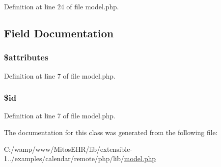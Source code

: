 \-Definition at line 24 of file model.\-php.




\subsection{\-Field \-Documentation}
\hypertarget{class_model_adc851f7a62250e75df0490c0280aef4c}{
\subsubsection[{\$attributes}]{\setlength{\rightskip}{0pt plus 5cm}\$attributes}}\label{class_model_adc851f7a62250e75df0490c0280aef4c}


\-Definition at line 7 of file model.\-php.

\hypertarget{class_model_ae97941710d863131c700f069b109991e}{
\subsubsection[{\$id}]{\setlength{\rightskip}{0pt plus 5cm}\$id}}\label{class_model_ae97941710d863131c700f069b109991e}


\-Definition at line 7 of file model.\-php.



\-The documentation for this class was generated from the following file\-:\begin{DoxyCompactItemize}
\item 
\-C\-:/wamp/www/\-Mitos\-E\-H\-R/lib/extensible-\/1../examples/calendar/remote/php/lib/\hyperlink{model_8php}{model.\-php}\end{DoxyCompactItemize}
